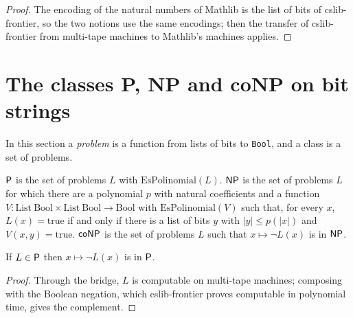 \begin{proof}
  \leanok
  The encoding of the natural numbers of Mathlib is the list of bits of cslib-frontier, so the two
  notions use the same encodings; then the transfer of cslib-frontier from multi-tape machines to Mathlib's
  machines applies.
\end{proof}

\section{The classes P, NP and coNP on bit strings}
\label{sec:machines-classes}

In this section a \emph{problem} is a function from lists of bits to \texttt{Bool}, and a class is a set
of problems.

\begin{definition}
  \label{def:machines-classes}
  \leanok
  $\mathsf{P}$ is the set of problems $L$ with $\mathrm{EsPolinomial}(L)$. $\mathsf{NP}$ is the set of problems $L$
  for which there are a polynomial $p$ with natural coefficients and a function
  $V : \mathrm{List}\ \mathrm{Bool} \times \mathrm{List}\ \mathrm{Bool} \to \mathrm{Bool}$ with
  $\mathrm{EsPolinomial}(V)$ such that, for every $x$,
  $L(x) = \mathrm{true}$ if and only if there is a list of bits $y$ with $|y| \le p(|x|)$ and
  $V(x, y) = \mathrm{true}$. $\mathsf{coNP}$ is the set of problems $L$ such that
  $x \mapsto \lnot L(x)$ is in $\mathsf{NP}$.
\end{definition}

\begin{theorem}
  \label{thm:machines-p-compl}
  \leanok
  If $L \in \mathsf{P}$ then $x \mapsto \lnot L(x)$ is in $\mathsf{P}$.
\end{theorem}

\begin{proof}
  \leanok
  Through the bridge, $L$ is computable on multi-tape machines; composing with the Boolean negation,
  which cslib-frontier proves computable in polynomial time, gives the complement.
\end{proof}


